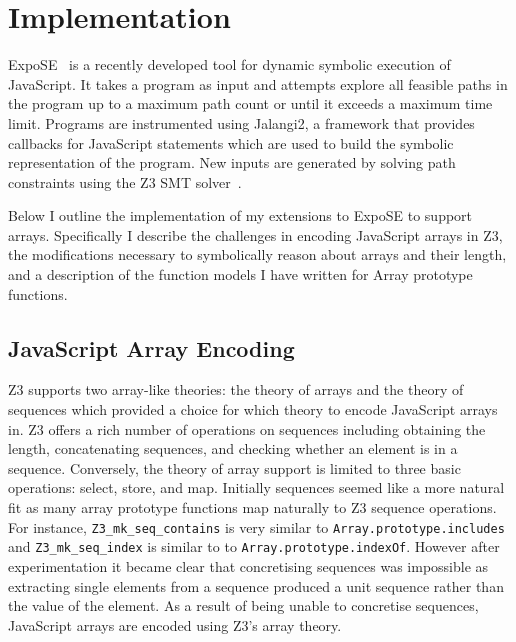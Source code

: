 \documentclass[]{final_report}
\begin{document}
\chapter{Implementation} \label{sec:implementation}

ExpoSE~\cite{Loring_2017} is a recently developed tool for dynamic symbolic execution of JavaScript. It takes a program as input and attempts explore all feasible paths in the program up to a maximum path count or until it exceeds a maximum time limit. Programs are instrumented using Jalangi2, a framework that provides callbacks for JavaScript statements which are used to build the symbolic representation of the program. New inputs are generated by solving path constraints using the Z3 SMT solver~\cite{de2008z3}.

Below I outline the implementation of my extensions to ExpoSE to support arrays. Specifically I describe the challenges in encoding JavaScript arrays in Z3, the modifications necessary to symbolically reason about arrays and their length, and a description of the function models I have written for Array prototype functions.

\section{JavaScript Array Encoding}
Z3 supports two array-like theories: the theory of arrays and the theory of sequences which provided a choice for which theory to encode JavaScript arrays in. Z3 offers a rich number of operations on sequences including obtaining the length, concatenating sequences, and checking whether an element is in a sequence. Conversely, the theory of array support is limited to three basic operations: select, store, and map. Initially sequences seemed like a more natural fit as many array prototype functions map naturally to Z3 sequence operations. For instance, \lstinline|Z3_mk_seq_contains| is very similar to \lstinline|Array.prototype.includes| and \lstinline|Z3_mk_seq_index| is similar to to \lstinline|Array.prototype.indexOf|. However after experimentation it became clear that concretising sequences was impossible as extracting single elements from a sequence produced a unit sequence rather than the value of the element. As a result of being unable to concretise sequences, JavaScript arrays are encoded using Z3’s array theory. 
\end{document}
